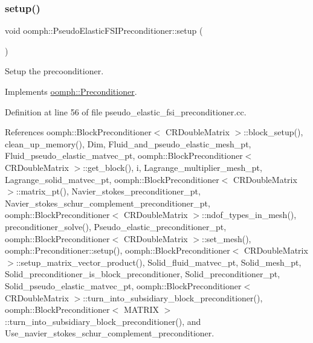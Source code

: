 \subsubsection{\texorpdfstring{setup()}{setup()}}
{\footnotesize\ttfamily void oomph\+::\+Pseudo\+Elastic\+F\+S\+I\+Preconditioner\+::setup (\begin{DoxyParamCaption}{ }\end{DoxyParamCaption})\hspace{0.3cm}{\ttfamily [virtual]}}



Setup the precoonditioner. 



Implements \hyperlink{classoomph_1_1Preconditioner_af4886f4efe510e5c9b0eb19422943588}{oomph\+::\+Preconditioner}.



Definition at line 56 of file pseudo\+\_\+elastic\+\_\+fsi\+\_\+preconditioner.\+cc.



References oomph\+::\+Block\+Preconditioner$<$ C\+R\+Double\+Matrix $>$\+::block\+\_\+setup(), clean\+\_\+up\+\_\+memory(), Dim, Fluid\+\_\+and\+\_\+pseudo\+\_\+elastic\+\_\+mesh\+\_\+pt, Fluid\+\_\+pseudo\+\_\+elastic\+\_\+matvec\+\_\+pt, oomph\+::\+Block\+Preconditioner$<$ C\+R\+Double\+Matrix $>$\+::get\+\_\+block(), i, Lagrange\+\_\+multiplier\+\_\+mesh\+\_\+pt, Lagrange\+\_\+solid\+\_\+matvec\+\_\+pt, oomph\+::\+Block\+Preconditioner$<$ C\+R\+Double\+Matrix $>$\+::matrix\+\_\+pt(), Navier\+\_\+stokes\+\_\+preconditioner\+\_\+pt, Navier\+\_\+stokes\+\_\+schur\+\_\+complement\+\_\+preconditioner\+\_\+pt, oomph\+::\+Block\+Preconditioner$<$ C\+R\+Double\+Matrix $>$\+::ndof\+\_\+types\+\_\+in\+\_\+mesh(), preconditioner\+\_\+solve(), Pseudo\+\_\+elastic\+\_\+preconditioner\+\_\+pt, oomph\+::\+Block\+Preconditioner$<$ C\+R\+Double\+Matrix $>$\+::set\+\_\+mesh(), oomph\+::\+Preconditioner\+::setup(), oomph\+::\+Block\+Preconditioner$<$ C\+R\+Double\+Matrix $>$\+::setup\+\_\+matrix\+\_\+vector\+\_\+product(), Solid\+\_\+fluid\+\_\+matvec\+\_\+pt, Solid\+\_\+mesh\+\_\+pt, Solid\+\_\+preconditioner\+\_\+is\+\_\+block\+\_\+preconditioner, Solid\+\_\+preconditioner\+\_\+pt, Solid\+\_\+pseudo\+\_\+elastic\+\_\+matvec\+\_\+pt, oomph\+::\+Block\+Preconditioner$<$ C\+R\+Double\+Matrix $>$\+::turn\+\_\+into\+\_\+subsidiary\+\_\+block\+\_\+preconditioner(), oomph\+::\+Block\+Preconditioner$<$ M\+A\+T\+R\+I\+X $>$\+::turn\+\_\+into\+\_\+subsidiary\+\_\+block\+\_\+preconditioner(), and Use\+\_\+navier\+\_\+stokes\+\_\+schur\+\_\+complement\+\_\+preconditioner.



